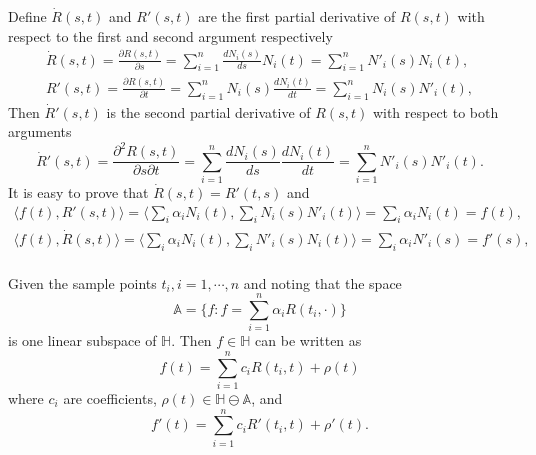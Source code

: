 Define $\dot{R}(s,t)$ and $R'(s,t)$ are the first partial derivative of $R(s,t)$ with respect to the first  and second argument respectively
\begin{align} \label{dotr}
\dot{R}(s,t)=\frac{\partial R(s,t)}{\partial s}=\sum_{i=1}^{n} \frac{dN_i(s)}{ds}N_i(t)=\sum_{i=1}^{n} N'_i(s)N_i(t),\\
\label{dotr2}
 R'(s,t)=\frac{\partial R(s,t)}{\partial t}=\sum_{i=1}^{n} N_i(s)\frac{dN_i(t)}{dt}=\sum_{i=1}^{n} N_i(s)N'_i(t),
\end{align}
Then $\dot{R}'(s,t)$ is the second partial derivative of $R(s,t)$ with respect to both arguments
\begin{equation}
\dot{R}'(s,t)=\frac{\partial^2 R(s,t)}{\partial s \partial t}=\sum_{i=1}^{n} \frac{dN_i(s)}{ds}\frac{dN_i(t)}{dt}=\sum_{i=1}^{n} N'_i(s)N'_i(t).
\end{equation}
It is easy to prove that $\dot{R}(s,t)=R'(t,s)$ and
\begin{equation}
\begin{split}
\langle f(t), R'(s,t)\rangle = \langle\sum_i \alpha_i N_i(t), \sum_i N_i(s)N'_i(t)\rangle =   \sum_i \alpha_i N_i(t) =f(t),\\
\langle f(t),\dot{R}(s,t)\rangle = \langle \sum_i \alpha_i N_i(t), \sum_i N'_i(s)N_i(t)\rangle =   \sum_i \alpha_i N'_i(s) =f'(s),\\
\end{split}
\end{equation}

Given the sample points $t_i, i=1, \cdots, n$ and noting that the space
\begin{equation}
\mathbb{A}=\{f: f=\sum_{i=1}^{n}\alpha_iR(t_i,\cdot) \} 
\end{equation}
is one linear subspace of $\mathbb{H}$. Then $f \in \mathbb{H}$ can be written as
\begin{equation}\label{etaeq}
f(t)=\sum_{i=1}^{n}c_iR(t_i,t)+\rho(t)
\end{equation}
where $c_i$ are coefficients, $\rho(t) \in \mathbb{H} \ominus \mathbb{A} $, and 
\begin{equation}\label{etaeq2}
f'(t)=\sum_{i=1}^{n}c_iR'(t_i,t)+\rho'(t).
\end{equation}

